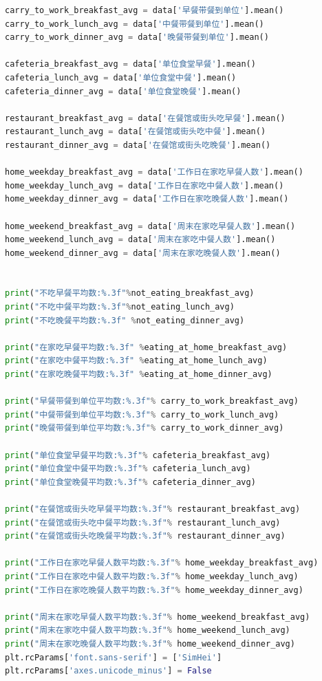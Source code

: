 \documentclass{cumcmthesis}
\begin{document}
\begin{appendices}
\begin{lstlisting}[language=python]
carry_to_work_breakfast_avg = data['早餐带餐到单位'].mean()
carry_to_work_lunch_avg = data['中餐带餐到单位'].mean()
carry_to_work_dinner_avg = data['晚餐带餐到单位'].mean()

cafeteria_breakfast_avg = data['单位食堂早餐'].mean()
cafeteria_lunch_avg = data['单位食堂中餐'].mean()
cafeteria_dinner_avg = data['单位食堂晚餐'].mean()

restaurant_breakfast_avg = data['在餐馆或街头吃早餐'].mean()
restaurant_lunch_avg = data['在餐馆或街头吃中餐'].mean()
restaurant_dinner_avg = data['在餐馆或街头吃晚餐'].mean()

home_weekday_breakfast_avg = data['工作日在家吃早餐人数'].mean()
home_weekday_lunch_avg = data['工作日在家吃中餐人数'].mean()
home_weekday_dinner_avg = data['工作日在家吃晚餐人数'].mean()

home_weekend_breakfast_avg = data['周末在家吃早餐人数'].mean()
home_weekend_lunch_avg = data['周末在家吃中餐人数'].mean()
home_weekend_dinner_avg = data['周末在家吃晚餐人数'].mean()


print("不吃早餐平均数:%.3f"%not_eating_breakfast_avg)
print("不吃中餐平均数:%.3f"%not_eating_lunch_avg)
print("不吃晚餐平均数:%.3f" %not_eating_dinner_avg)

print("在家吃早餐平均数:%.3f" %eating_at_home_breakfast_avg)
print("在家吃中餐平均数:%.3f" %eating_at_home_lunch_avg)
print("在家吃晚餐平均数:%.3f" %eating_at_home_dinner_avg)

print("早餐带餐到单位平均数:%.3f"% carry_to_work_breakfast_avg)
print("中餐带餐到单位平均数:%.3f"% carry_to_work_lunch_avg)
print("晚餐带餐到单位平均数:%.3f"% carry_to_work_dinner_avg)

print("单位食堂早餐平均数:%.3f"% cafeteria_breakfast_avg)
print("单位食堂中餐平均数:%.3f"% cafeteria_lunch_avg)
print("单位食堂晚餐平均数:%.3f"% cafeteria_dinner_avg)

print("在餐馆或街头吃早餐平均数:%.3f"% restaurant_breakfast_avg)
print("在餐馆或街头吃中餐平均数:%.3f"% restaurant_lunch_avg)
print("在餐馆或街头吃晚餐平均数:%.3f"% restaurant_dinner_avg)

print("工作日在家吃早餐人数平均数:%.3f"% home_weekday_breakfast_avg)
print("工作日在家吃中餐人数平均数:%.3f"% home_weekday_lunch_avg)
print("工作日在家吃晚餐人数平均数:%.3f"% home_weekday_dinner_avg)

print("周末在家吃早餐人数平均数:%.3f"% home_weekend_breakfast_avg)
print("周末在家吃中餐人数平均数:%.3f"% home_weekend_lunch_avg)
print("周末在家吃晚餐人数平均数:%.3f"% home_weekend_dinner_avg)
plt.rcParams['font.sans-serif'] = ['SimHei']
plt.rcParams['axes.unicode_minus'] = False


\end{lstlisting}
\end{appendices}
\end{document}
